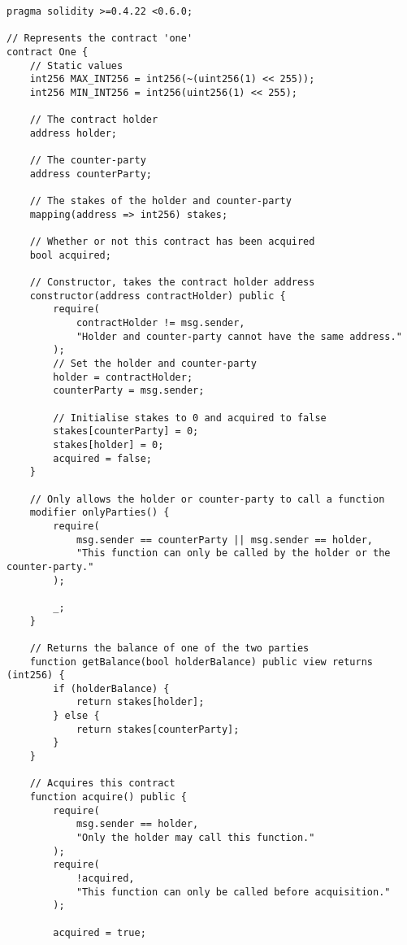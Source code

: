 \begin{lstlisting}[language=Solidity, caption={A Solidity smart contract for the \textit{one} contract case study in section \ref{case-studies}.}, captionpos=b, breaklines=true, postbreak=\mbox{\textcolor{red}{$\hookrightarrow$}\space}]
pragma solidity >=0.4.22 <0.6.0;

// Represents the contract 'one'
contract One {
    // Static values
    int256 MAX_INT256 = int256(~(uint256(1) << 255));
    int256 MIN_INT256 = int256(uint256(1) << 255);

    // The contract holder
    address holder;

    // The counter-party
    address counterParty;

    // The stakes of the holder and counter-party
    mapping(address => int256) stakes;

    // Whether or not this contract has been acquired
    bool acquired;

    // Constructor, takes the contract holder address
    constructor(address contractHolder) public {
        require(
            contractHolder != msg.sender,
            "Holder and counter-party cannot have the same address."
        );
        // Set the holder and counter-party
        holder = contractHolder;
        counterParty = msg.sender;

        // Initialise stakes to 0 and acquired to false
        stakes[counterParty] = 0;
        stakes[holder] = 0;
        acquired = false;
    }

    // Only allows the holder or counter-party to call a function
    modifier onlyParties() {
        require(
            msg.sender == counterParty || msg.sender == holder,
            "This function can only be called by the holder or the counter-party."
        );

        _;
    }

    // Returns the balance of one of the two parties
    function getBalance(bool holderBalance) public view returns (int256) {
        if (holderBalance) {
            return stakes[holder];
        } else {
            return stakes[counterParty];
        }
    }

    // Acquires this contract
    function acquire() public {
        require(
            msg.sender == holder,
            "Only the holder may call this function."
        );
        require(
            !acquired,
            "This function can only be called before acquisition."
        );

        acquired = true;


\end{lstlisting}
